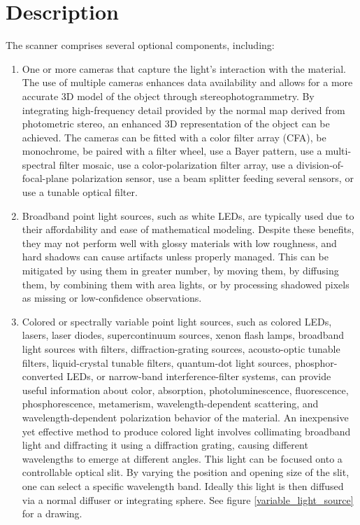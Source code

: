 \documentclass[11pt, twoside, listof=totocnumbered, bibliography=totocnumbered]{scrartcl}
\begin{document}
	\section{Description}
	The scanner comprises several optional components, including:
	\begin{enumerate}
		\item One or more cameras that capture the light's interaction with the material. The use of multiple cameras enhances data availability and allows for a more accurate 3D model of the object through stereophotogrammetry. By integrating high-frequency detail provided by the normal map derived from photometric stereo, an enhanced 3D representation of the object can be achieved. The cameras can be fitted with a color filter array (CFA), be monochrome, be paired with a filter wheel, use a Bayer pattern, use a multi-spectral filter mosaic, use a color-polarization filter array, use a division-of-focal-plane polarization sensor, use a beam splitter feeding several sensors, or use a tunable optical filter.
		
		\item Broadband point light sources, such as white LEDs, are typically used due to their affordability and ease of mathematical modeling. Despite these benefits, they may not perform well with glossy materials with low roughness, and hard shadows can cause artifacts unless properly managed. This can be mitigated by using them in greater number, by moving them, by diffusing them, by combining them with area lights, or by processing shadowed pixels as missing or low-confidence observations.
		
		\item Colored or spectrally variable point light sources, such as colored LEDs, lasers, laser diodes, supercontinuum sources, xenon flash lamps, broadband light sources with filters, diffraction-grating sources, acousto-optic tunable filters, liquid-crystal tunable filters, quantum-dot light sources, phosphor-converted LEDs, or narrow-band interference-filter systems, can provide useful information about color, absorption, photoluminescence, fluorescence, phosphorescence, metamerism, wavelength-dependent scattering, and wavelength-dependent polarization behavior of the material. An inexpensive yet effective method to produce colored light involves collimating broadband light and diffracting it using a diffraction grating, causing different wavelengths to emerge at different angles. This light can be focused onto a controllable optical slit. By varying the position and opening size of the slit, one can select a specific wavelength band. Ideally this light is then diffused via a normal diffuser or integrating sphere. See figure \ref{variable_light_source} for a drawing.
		

\end{enumerate}
\end{document}
